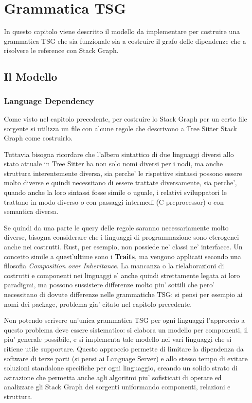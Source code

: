 \chapter{Grammatica TSG}

In questo capitolo viene descritto il modello da implementare per costruire una grammatica TSG che sia funzionale sia a costruire il grafo delle dipendenze che a risolvere le reference con Stack Graph.

\section{Il Modello}

\subsection{Language Dependency}

Come visto nel capitolo precedente, per costruire lo Stack Graph per un certo file sorgente si utilizza un file con alcune regole che descrivono a Tree Sitter Stack Graph come costruirlo.

\par
Tuttavia bisogna ricordare che l'albero sintattico di due linguaggi diversi allo stato attuale in Tree Sitter ha non solo nomi diversi per i nodi, ma anche struttura interentemente diversa, sia perche' le rispettive sintassi possono essere molto diverse e quindi necessitano di essere trattate diversamente, sia perche', quando anche la loro sintassi fosse simile o uguale, i relativi sviluppatori le trattano in modo diverso o con passaggi intermedi (C preprocessor) o con semantica diversa.

\par
Se quindi da una parte le query delle regole saranno necessariamente molto diverse, bisogna considerare che i linguaggi di programmazione sono eterogenei anche nei costrutti.
Rust, per esempio, non possiede ne' classi ne' interfacce. Un concetto simile a quest'ultime sono i \textbf{Traits}, ma vengono applicati secondo una filosofia \emph{Composition over Inheritance}.
La mancanza o la rielaborazioni di costrutti e componenti nei linguaggi e' anche quindi strettamente legata ai loro paradigmi, ma possono sussistere differenze molto piu' sottili che pero' necessitano di dovute differenze nelle grammatiche TSG: si pensi per esempio ai nomi dei package, problema gia' citato nel capitolo precedente.

\par
Non potendo scrivere un'unica grammatica TSG per ogni linguaggi l'approccio a questo problema deve essere sistematico: si elabora un modello per componenti, il piu' generale possibile, e si implementa tale modello nei vari linguaggi che si ritiene utile supportare.
Questo approccio permette di limitare la dipendenza da software di terze parti (si pensi ai Language Server) e allo stesso tempo di evitare soluzioni standalone specifiche per ogni linguaggio, creando un solido strato di astrazione che permetta anche agli algoritmi piu' sofisticati di operare ed analizzare gli Stack Graph dei sorgenti uniformando componenti, relazioni e struttura.

